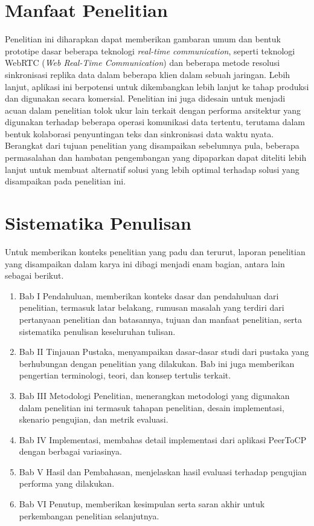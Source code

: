 \section{Manfaat Penelitian}
\label{sec:manfaat}
Penelitian ini diharapkan dapat memberikan gambaran umum dan bentuk prototipe dasar beberapa teknologi \textit{real-time communication}, seperti teknologi WebRTC (\textit{Web Real-Time Communication}) dan beberapa metode resolusi sinkronisasi replika data dalam beberapa klien dalam sebuah jaringan. Lebih lanjut, aplikasi ini berpotensi untuk dikembangkan lebih lanjut ke tahap produksi dan digunakan secara komersial. Penelitian ini juga didesain untuk menjadi acuan dalam penelitian tolok ukur lain terkait dengan performa arsitektur yang digunakan terhadap beberapa operasi komunikasi data tertentu, terutama dalam bentuk kolaborasi penyuntingan teks dan sinkronisasi data waktu nyata. Berangkat dari tujuan penelitian yang disampaikan sebelumnya pula, beberapa permasalahan dan hambatan pengembangan yang dipaparkan dapat diteliti lebih lanjut untuk membuat alternatif solusi yang lebih optimal terhadap solusi yang disampaikan pada penelitian ini.

\section{Sistematika Penulisan}

Untuk memberikan konteks penelitian yang padu dan terurut, laporan penelitian yang disampaikan dalam karya ini dibagi menjadi enam bagian, antara lain sebagai berikut.

\begin{enumerate}[noitemsep]
    \item Bab I Pendahuluan, memberikan konteks dasar dan pendahuluan dari penelitian, termasuk latar belakang, rumusan masalah yang terdiri dari pertanyaan penelitian dan batasannya, tujuan dan manfaat penelitian, serta sistematika penulisan keseluruhan tulisan.
    \item Bab II Tinjauan Pustaka, menyampaikan dasar-dasar studi dari pustaka yang berhubungan dengan penelitian yang dilakukan. Bab ini juga memberikan pengertian terminologi, teori, dan konsep tertulis terkait.
    \item Bab III Metodologi Penelitian, menerangkan metodologi yang digunakan dalam penelitian ini termasuk tahapan penelitian, desain implementasi, skenario pengujian, dan metrik evaluasi.
    \item Bab IV Implementasi, membahas detail implementasi dari aplikasi PeerToCP dengan berbagai variasinya.
    \item Bab V Hasil dan Pembahasan, menjelaskan hasil evaluasi terhadap pengujian performa yang dilakukan.
    \item Bab VI Penutup, memberikan kesimpulan serta saran akhir untuk perkembangan penelitian selanjutnya.
\end{enumerate}